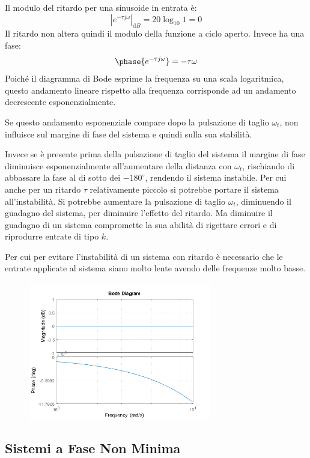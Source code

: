 \documentclass{article}
\numberwithin{equation}{subsection}
\newcommand{\df}{\mathrm{d}}
\begin{document}
Il modulo del ritardo per una sinusoide in entrata è:
\begin{equation*}
    |e^{-\tau j\omega}|_{\df B}=20\log_{10}1=0
\end{equation*}
Il ritardo non altera quindi il modulo della funzione a ciclo aperto.  
Invece ha una fase: 
\begin{equation*}
    \phase{e^{-\tau j\omega}}=-\tau\omega
\end{equation*}
Poiché il diagramma di Bode esprime la frequenza su una scala logaritmica, questo andamento lineare rispetto alla 
frequenza corrisponde ad un andamento decrescente esponenzialmente. 

Se questo andamento esponenziale compare dopo la pulsazione di taglio $\omega_t$, non influisce sul margine di fase del sistema e quindi sulla sua stabilità. 

Invece se è presente 
prima della pulsazione di taglio del sistema il margine di fase diminuisce esponenzialmente all'aumentare della distanza con $\omega_t$, rischiando di abbassare la fase al 
di sotto dei $-180^{\circ}$, rendendo il sistema instabile. Per cui anche per un ritardo $\tau$ relativamente piccolo si potrebbe portare il sistema all'instabilità. 
Si potrebbe aumentare la pulsazione di taglio $\omega_t$, diminuendo il guadagno del sistema, per diminuire l'effetto del ritardo. Ma diminuire il guadagno di un sistema 
compromette la sua abilità di rigettare errori e di riprodurre entrate di tipo $k$.  

Per cui per evitare l'instabilità di un sistema con ritardo è necessario che le entrate applicate al sistema siano molto lente avendo delle frequenze molto basse. 

\begin{figure}[H]%
    \centering
    \includegraphics[width=8cm]{Bode2.png}%
\end{figure}

\subsection{Sistemi a Fase Non Minima}
\end{document}
